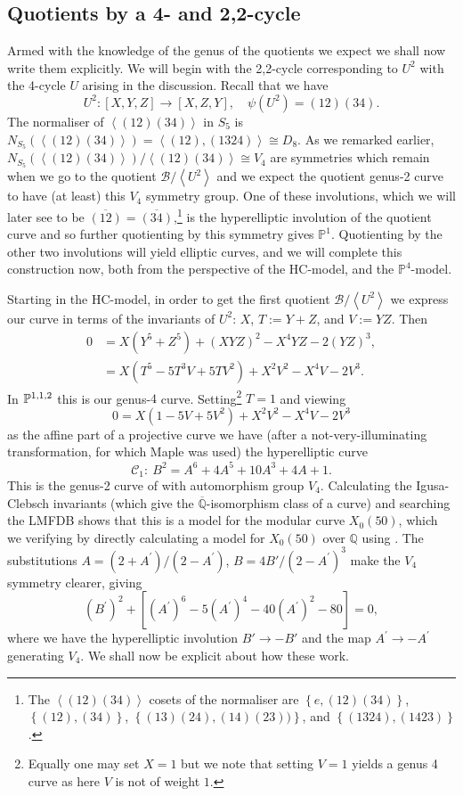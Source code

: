 \documentclass{amsart}
\newcommand{\psquare}[1]{\left[ #1 \right]}
\newcommand{\pbrace}[1]{\left\{ #1 \right\} }
\newcommand{\pangle}[1]{\left\langle #1 \right\rangle}
\begin{document}
\subsection{Quotients by a 4- and 2,2-cycle}\label{subsec: quotients by 4 and 2-2 cycle}
Armed with the knowledge of the genus of the quotients we expect we shall now write them explicitly. We will begin with the 2,2-cycle corresponding to $U^2$ with the 4-cycle $U$ arising in the discussion.  Recall that we have  
$$
U^2:[X,Y,Z]\rightarrow [X,Z,Y], \quad \psi(U^2)=(12)(34)  .
$$
The normaliser of $\pangle{(12)(34)}$ in $S_5$ is $N_{S_5}(\pangle{(12)(34)})=\pangle{(12), (1324)}\cong D_8$. As we remarked earlier, $N_{S_5}(\pangle{(12)(34)})/\pangle{(12)(34)}\cong V_4$ are symmetries which remain when we go to the quotient $\mathcal{B}/\pangle{U^2}$ and we expect the quotient genus-2 curve to have (at least) this $V_4$ symmetry group. One of these involutions, which we will later see to be $\overline{(12)} = \overline{(34)}$,\footnote{The $\pangle{(12)(34)}$ cosets of the normaliser are $\pbrace{e, (1 2)(3 4)}$, $\pbrace{(12), (34)}$, $\pbrace{(13)(24), (14)(23))}$, and $\pbrace{(1324), (1423)}$.} is the hyperelliptic involution of the quotient curve and so further quotienting by this symmetry gives $\mathbb{P}^1$. Quotienting by the other two involutions will yield elliptic curves, and we will complete this construction now, both from the perspective of the HC-model, and the $\mathbb{P}^4$-model. 


Starting in the HC-model, in order to get the first quotient $\mathcal{B}/\pangle{U^2}$ we express our curve in terms of the invariants of $U^2$: $X$, $T:=Y+Z$, and $V:=YZ$. Then
\begin{align*}
 0&= X(Y^5+Z^5) + (XYZ)^2 - X^4YZ -2(YZ)^3 ,   \\  &
=X(T^5-5 T^3 V+5 T V^2)+ X^2 V^2 -X^4 V-2 V^3 . 
\end{align*}
In $\mathbb{P}\sp{1,1,2}$ this is our genus-$4$ curve. Setting\footnote{Equally one may set $X=1$ but we note that setting $V=1$ yields a genus 4 curve as here $V$ is not of weight $1$. 
} $T=1$ and viewing 
$$
0=X(1-5V+ 5V^2)+X^2 V^2 -X^4 V-2 V^3
$$
as the affine part of a projective curve we have (after a not-very-illuminating transformation, for which Maple was used) the hyperelliptic curve
\begin{equation}
\label{qc1} 
\mathcal{C}_1:\  B^2 =A^6 +4 A^5 +10 A^3 + 4 A +1  .
\end{equation}
This is the genus-2 curve of \cite{Riera1992} with automorphism group $V_4$. Calculating the Igusa-Clebsch invariants (which give the $\overline{\mathbb{Q}}$-isomorphism class of a curve) and searching the LMFDB \cite{LMFDB} shows that this is a model for the modular curve $X_0(50)$, which we verifying by directly calculating a model for $X_0(50)$ over $\mathbb{Q}$ using \cite{Shimura1995}. The substitutions $A=(2+A^\prime)/(2-A^\prime)$, $B=4  B'/(2-A^\prime)^3$ make the $V_4$ symmetry clearer, giving
$$
(B^\prime)^2 + \psquare{(A^\prime)^6-5 (A^\prime)^4 -40 (A^\prime)^2 -80} = 0  ,
$$
where we have the hyperelliptic involution $B'\rightarrow -B'$ and the map $A^\prime \rightarrow -A^\prime$ generating $V_4$. We shall now be explicit about how these work.
\end{document}
